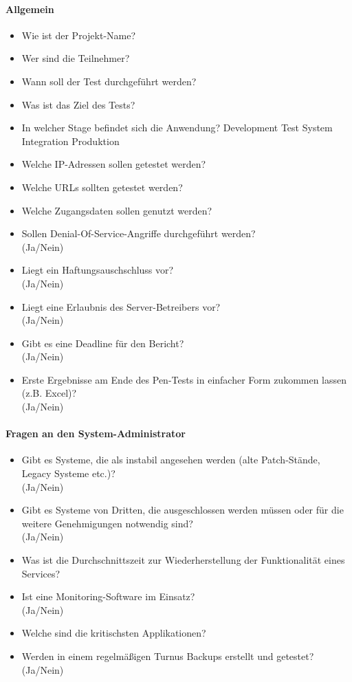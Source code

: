 \paragraph{Allgemein}
\begin{itemize}
	\item Wie ist der Projekt-Name?
	\item Wer sind die Teilnehmer?
	\item Wann soll der Test durchgeführt werden?
	\item Was ist das Ziel des Tests?
	\item In welcher Stage befindet sich die Anwendung? Development Test System Integration Produktion
	\item Welche IP-Adressen sollen getestet werden?
	\item Welche URLs sollten getestet werden?
	\item Welche Zugangsdaten sollen genutzt werden?
	\item Sollen Denial-Of-Service-Angriffe durchgeführt werden?\\
	(Ja/Nein)
	\item Liegt ein Haftungsauschschluss vor?\\
	(Ja/Nein)
	\item Liegt eine Erlaubnis des Server-Betreibers vor?\\
	(Ja/Nein)
	\item Gibt es eine Deadline für den Bericht?\\
	(Ja/Nein)
	\item Erste Ergebnisse am Ende des Pen-Tests in einfacher Form zukommen lassen (z.B. Excel)?\\
	(Ja/Nein)
\end{itemize}


\paragraph{Fragen an den System-Administrator}
\begin{itemize}
\item Gibt es Systeme, die als instabil angesehen werden (alte Patch-Stände, Legacy Systeme etc.)?\\
(Ja/Nein)
\item Gibt es Systeme von Dritten, die ausgeschlossen werden müssen oder für die weitere Genehmigungen notwendig sind?\\
(Ja/Nein)
\item Was ist die Durchschnittszeit zur Wiederherstellung der Funktionalität eines Services?
\item Ist eine Monitoring-Software im Einsatz?\\
(Ja/Nein)
\item Welche sind die kritischsten Applikationen?
\item Werden in einem regelmäßigen Turnus Backups erstellt und getestet?\\
(Ja/Nein)
\end{itemize}

